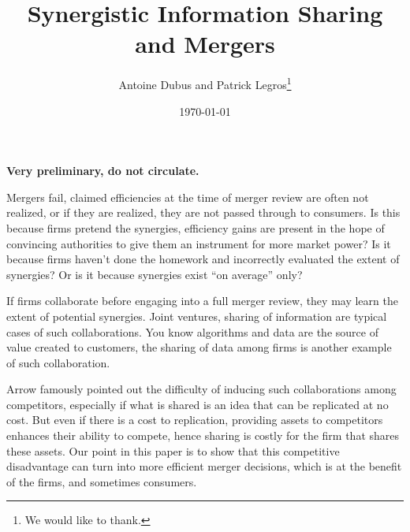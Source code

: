 \documentclass[a4paper,leqno]{article}%
\begin{document}
\title{Synergistic Information Sharing and Mergers}
\author{Antoine Dubus and Patrick Legros\thanks{We would like to thank.}}
\date{\today}


\maketitle

 
\textbf{Very preliminary, do not circulate.}

\baselineskip0.7cm
Mergers fail, claimed efficiencies at the time of merger review are often not realized, or if they are realized, they are not passed through to consumers. Is this because firms pretend the synergies, efficiency gains are present in the hope of convincing authorities to give them an instrument for more market power? Is it because firms haven't done the homework and incorrectly evaluated the extent of synergies? Or is it because synergies exist ``on average'' only?

If firms collaborate before engaging into a full merger review, they may learn the extent of potential synergies. Joint ventures, sharing of information are typical cases of such collaborations. You know algorithms and data are the source of value created to customers, the sharing of data among firms is another example of such collaboration.

Arrow famously pointed out the difficulty of inducing such collaborations among competitors, especially if what is shared is an idea that can be replicated at no cost. But even if there is a cost to replication, providing assets to competitors enhances their ability to compete, hence sharing is costly for the firm that shares these assets. Our point in this paper is to show that this competitive disadvantage can turn into more efficient merger decisions, which is at the benefit of the firms, and sometimes consumers.
\end{document}
